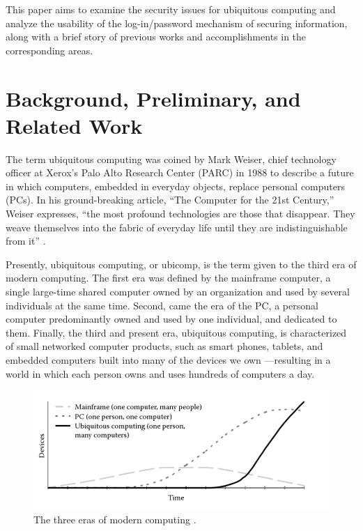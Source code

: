 \documentclass{article}
\begin{document}
This paper aims to examine the security issues for ubiquitous computing and analyze the usability of the log-in/password mechanism of securing information, along with a brief story of previous works and accomplishments in the corresponding areas. 

\section{Background, Preliminary, and Related Work}
The term ubiquitous computing was coined by Mark Weiser, chief technology officer at Xerox's Palo Alto Research Center (PARC) in 1988 to describe a future in which computers, embedded in everyday objects, replace personal computers (PCs). In his ground-breaking article, ``The Computer for the 21st Century,'' Weiser expresses, ``the most profound technologies are those that disappear. They weave themselves into the fabric of everyday life until they are indistinguishable from it'' \cite{weiser1991computer}.

Presently, ubiquitous computing, or ubicomp, is the term given to the third era of modern computing. The first era was defined by the mainframe computer, a single large-time shared computer owned by an organization and used by several individuals at the same time. Second, came the era of the PC, a personal computer predominantly owned and used by one individual, and dedicated to them. Finally, the third and present era, ubiquitous computing, is characterized of small networked computer products, such as smart phones, tablets, and embedded computers built into many of the devices we own ---resulting in a world in which each person owns and uses hundreds of computers a day.

\begin{figure}
  \centering
    \includegraphics[scale=0.7]{eras_modern_computing}
     \caption{The three eras of modern computing \cite{weiser1991computer}.}
\end{figure}
\end{document}
